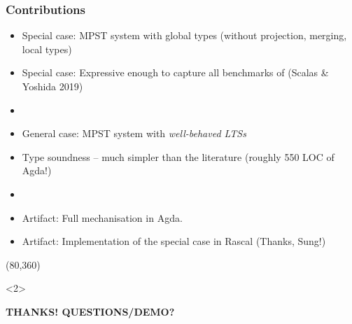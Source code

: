 \documentclass{ltx-talk}
\begin{document}
\begin{frame}\frametitle{Contributions}
  \begin{itemize}
  \item Special case: MPST system with global types (without projection, merging, local types)
  \item Special case: Expressive enough to capture all benchmarks of (Scalas \& Yoshida 2019)
  \item[] 
  \item General case: MPST system with \emph{well-behaved LTSs} 
  \item Type soundness -- much simpler than the literature (roughly 550 LOC of Agda!)
  \item[]
  \item Artifact: Full mechanisation in Agda. 
  \item Artifact: Implementation of the special case in Rascal (Thanks, Sung!)
  \end{itemize}
  \Put(80,360){%
    \begin{onlyenv}<2>
    \begin{minipage}{.66\columnwidth}
    \begin{sticky}
      \Huge
      \textbf{THANKS! QUESTIONS/DEMO?}
    \end{sticky}
    \end{minipage}
    \end{onlyenv}
  }
\end{frame}
\end{document}
